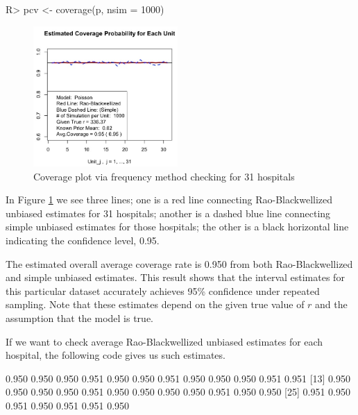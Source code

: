 \documentclass[article]{jss}
\begin{document}
\begin{CodeChunk}
\begin{CodeInput}
R> pcv <- coverage(p, nsim = 1000)
\end{CodeInput}
\end{CodeChunk}
\begin{figure}[h] 
\begin{center}
\includegraphics[width = 5.5cm]{hospital2.png}
\caption{Coverage plot via frequency method checking for 31 hospitals}
\label{fig:hospitalcoverage}
\end{center}
\end{figure}

In Figure \ref{fig:hospitalcoverage} we see three lines; one is a red line connecting Rao-Blackwellized unbiased estimates for 31 hospitals; another is a dashed blue line connecting simple unbiased estimates for those hospitals; the other is a black horizontal line indicating the confidence level, 0.95. 

The estimated overall average coverage rate is 0.950 from both Rao-Blackwellized and simple unbiased estimates. This result shows that the interval estimates for this particular dataset accurately achieves 95\% confidence under repeated sampling. Note that these estimates depend on the given true value of $r$ and the assumption that the model is true.

If we want to check average Rao-Blackwellized unbiased estimates for each hospital, the following code gives us such estimates.
\begin{CodeChunk}
\begin{CodeOutput}
 [1] 0.950 0.950 0.950 0.951 0.950 0.950 0.951 0.950 0.950 0.950 0.951 0.951 
[13] 0.950 0.950 0.950 0.950 0.951 0.950 0.950 0.950 0.950 0.951 0.950 0.950 
[25] 0.951 0.950 0.951 0.950 0.951 0.951 0.950
\end{CodeOutput}
\end{CodeChunk}
\end{document}
